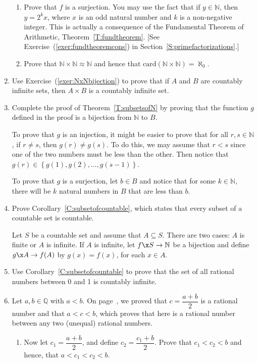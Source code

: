 \begin{enumerate}
\begin{enumerate}
\item Prove that $f$ is a surjection.  \hint  You may use the fact that if $y \in \mathbb{N}$, then $y = 2^k x$, where $x$ is an odd natural number and $k$ is a non-negative integer.  This is actually a consequence of the Fundamental Theorem of Arithmetic, Theorem~\ref{T:fundtheorem}.  [See Exercise~(\ref{exer:fundtheoremcons}) in Section~\ref{S:primefactorizations}.]

\item Prove that $\mathbb{N} \times \mathbb{N} \approx \mathbb{N}$ and hence that 
$\text{card} \left( \mathbb{N} \times \mathbb{N} \right) = \aleph_0$.
\end{enumerate}

\item Use Exercise~(\ref{exer:NxNbijection}) to prove that if $A$ and $B$ are countably infinite sets, then $A \times B$ is a countably infinite set.

\item Complete the proof of Theorem~\ref{T:subsetsofN} by proving that the function $g$ defined in the proof is a bijection from $\mathbb{N}$ to $B$. 
\label{exer:subsetofN}%

\hint  To prove that $g$ is an injection, it might be easier to prove that for all 
$r, s \in \mathbb{N}$, if $r \ne s$, then $g ( r ) \ne g ( s )$.  To do this, we may assume that $r < s$ since one of the two numbers must be less than the other.  Then notice that $g ( r ) \in \left\{ g( 1 ), g( 2 ), \ldots, g( s-1 ) \right\}$.

To prove that $g$ is a surjection, let $b \in B$ and notice that for some $k \in \mathbb{N}$, there will be $k$ natural numbers in $B$ that are less than $b$.

\item Prove Corollary~\ref{C:subsetofcountable}, which states that every subset of a countable set is countable. 
\label{exer:subsetofcountable}%

\hint  Let $S$ be a countable set and assume that $A \subseteq S$.  There are two cases:  $A$ is finite or $A$ is infinite.  If $A$ is infinite, let $f\x S \to \mathbb{N}$ be a bijection and define $g\x A \to f ( A )$ by $g ( x ) = f ( x )$, for each $x \in A$.

\item Use Corollary~\ref{C:subsetofcountable} to prove that the set of all rational numbers between 0 and 1 is countably infinite. 

\item \label{exer:tworationals} Let $a, b \in \mathbb{Q}$ with $a < b$. On page~\pageref{tworationals}, we proved that $c = \dfrac{a+b}{2}$ is a rational number and that $a < c < b$, which proves that here is a rational number between any two (unequal) rational numbers.
\begin{enumerate}
\item Now let  $c_1 = \dfrac{a+b}{2}$, and define $c_2 = \dfrac{c_1 + b}{2}$.  Prove that 
$c_1 < c_2 < b$ and hence, that $a < c_1 < c_2 < b$.



\end{enumerate}
\end{enumerate}
